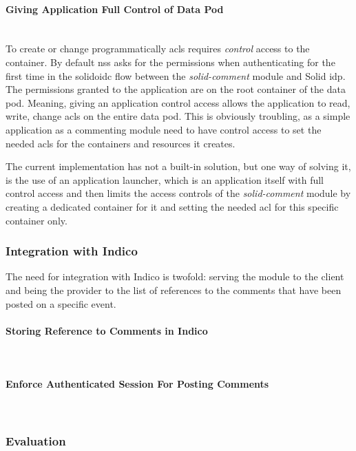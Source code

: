 \paragraph{Giving Application Full Control of Data Pod}\mbox{}\\

To create or change programmatically \glspl{acl} requires \textit{control} access to the container. By default \gls{nss} asks for the permissions when authenticating for the first time in the \gls{solidoidc} flow between the \textit{solid-comment} module and Solid \gls{idp}. The permissions granted to the application are on the root container of the data pod. Meaning, giving an application control access allows the application to read, write, change \glspl{acl} on the entire data pod. This is obviously troubling, as a simple application as a commenting module need to have control access to set the needed \glspl{acl} for the containers and resources it creates.

The current implementation has not a built-in solution, but one way of solving it, is the use of an application launcher, which is an application itself with full control access and then limits the access controls of the \textit{solid-comment} module by creating a dedicated container for it and setting the needed \gls{acl} for this specific container only.

\subsubsection{Integration with Indico}

The need for integration with Indico is twofold: serving the module to the client and being the provider to the list of references to the comments that have been posted on a specific event.

\paragraph{Storing Reference to Comments in Indico}\mbox{}\\

\paragraph{Enforce Authenticated Session For Posting Comments}\mbox{}\\

\subsubsection{Evaluation}\mbox{}\\

